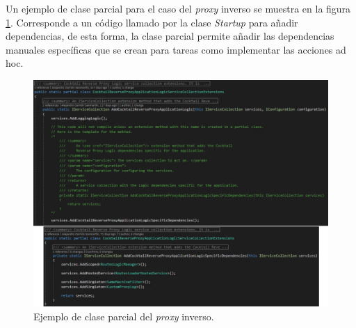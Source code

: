 \documentclass[11pt,spanish,listoffigures]{tfgetsinf}
\begin{document}
Un ejemplo de clase parcial para el caso del \emph{proxy} inverso se muestra en la figura \ref{claseParcial}. Corresponde a un código llamado por la clase \emph{Startup} para añadir dependencias, de esta forma, la clase parcial permite añadir las dependencias manuales específicas que se crean para tareas como implementar las acciones ad hoc.

\begin{figure}[H] %
\centering
\includegraphics[width=1\textwidth]{imagenes/apendice/claseParcial}
\caption{Ejemplo de clase parcial del \emph{proxy} inverso.}
	\label{claseParcial}
\end{figure}
\end{document}

